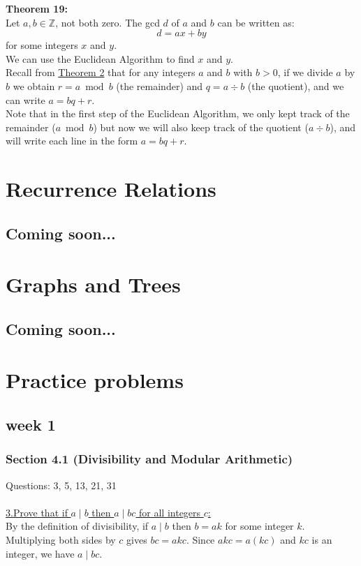 \documentclass[12pt]{article}
\begin{document}
\newpage
\noindent\textbf{Theorem 19:}
\label{thm:bezout}
\\Let $a,b \in \mathbb{Z}$, not both zero. 
The gcd $d$ of $a$ and $b$ can be written as:
\[
d = ax + by
\]
for some integers $x$ and $y$.  
\\We can use the Euclidean Algorithm to find $x$ and $y$.  
\\Recall from \hyperref[thm:division]{Theorem 2} that for any integers 
$a$ and $b$ with $b>0$, if we divide $a$ by $b$ we obtain $r=a \bmod b$ (the remainder) and $q=a \div b$ (the quotient), and we can write $a=bq+r$.
\\Note that in the first step of the Euclidean Algorithm, we only kept track of the 
remainder ($a \bmod b$) but now we will also keep track of the quotient ($a \div b$),
and will write each line in the form $a=bq+r$.

\newpage
\section{Recurrence Relations}
\subsection*{Coming soon...}

\newpage
\section{Graphs and Trees}
\subsection*{Coming soon...}

\newpage
\section{Practice problems}
\subsection*{week 1}


\subsubsection*{Section 4.1 (Divisibility and Modular Arithmetic)}

Questions: 3, 5, 13, 21, 31
\\\\
\underline{3.\;Prove that if $a \mid b$ then $a \mid bc$ for all integers $c$:}
\\\indent By the definition of divisibility, if $a \mid b$ then $b = ak$ for some integer $k$.
Multiplying both sides by $c$ gives $bc = akc$.
Since $akc = a(kc)$ and $kc$ is an integer, we have $a \mid bc$.   
\end{document}
